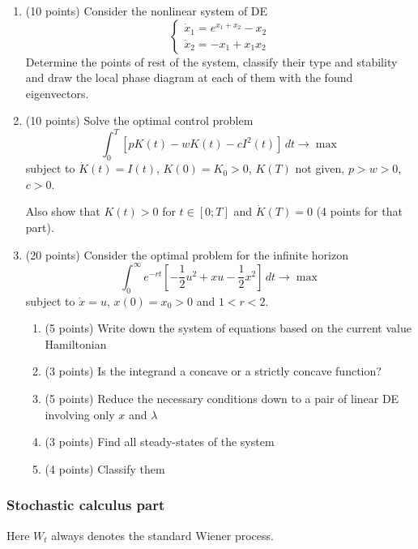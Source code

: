 \documentclass[12pt, a4paper]{article}
\begin{document}
\begin{enumerate}
\item (10 points) Consider the nonlinear system of DE
\[
\begin{cases}
\dot{x}_1=e^{x_1+x_2}-x_2 \\
\dot{x}_2=-x_1+x_1x_2
\end{cases}
\]
Determine the points of rest of the system, classify their type and stability and draw the local
phase diagram at each of them with the found eigenvectors.

\item (10 points) Solve the optimal control problem
\[
\int_0^T \left[ pK(t)-wK(t)-cI^2(t)  \right] \, dt \to \max
\]
subject to $\dot{K}(t)=I(t)$, $K(0)=K_0>0$, $K(T)$ not given, $p>w>0$, $c>0$.


Also show that $K(t)>0$ for $t\in [0;T]$ and $\dot{K}(T)=0$ (4 points for that part).

\item (20 points) Consider the optimal problem for the infinite horizon
\[
\int_0^{\infty} e^{-rt}\left[ -\frac{1}{2}u^2+xu-\frac{1}{2}x^2  \right] \, dt \to \max
\]
subject to $\dot{x}=u$, $x(0)=x_0>0$ and $1<r<2$.

\begin{enumerate}
\item  (5 points) Write down the system of equations based on the current value Hamiltonian
\item  (3 points) Is the integrand a concave or a strictly concave function?
\item  (5 points) Reduce the necessary conditions down to a pair of linear DE involving only $x$ and $\lambda$
\item  (3 points) Find all steady-states of the system
\item  (4 points) Classify them
\end{enumerate}
\end{enumerate}


\subsubsection*{Stochastic calculus part}



Here $W_t$ always denotes the standard Wiener process.

\vspace{10pt}
\end{document}
